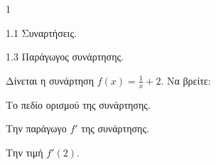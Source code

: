 \begin{ylh}{1}
    \item 1.1 Συναρτήσεις.
    \item 1.3 Παράγωγος συνάρτησης.
\end{ylh}
Δίνεται η συνάρτηση $f(x) = \frac{1}{x} + 2$. Να βρείτε:
\begin{alist}
    \item Το πεδίο ορισμού της συνάρτησης. 
    \item Την παράγωγο $f'$ της συνάρτησης. 
    \item Την τιμή $f'(2)$. 
\end{alist}

